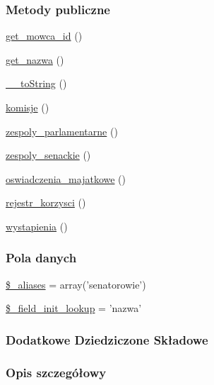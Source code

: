 \subsubsection*{Metody publiczne}
\begin{DoxyCompactItemize}
\item 
\hyperlink{classep___senator_a2048656fee42acbb0bd6a87c65d1812c}{get\-\_\-mowca\-\_\-id} ()
\item 
\hyperlink{classep___senator_ac0818f0049d7b84f08f77128f54cee36}{get\-\_\-nazwa} ()
\item 
\hyperlink{classep___senator_a7516ca30af0db3cdbf9a7739b48ce91d}{\-\_\-\-\_\-to\-String} ()
\item 
\hyperlink{classep___senator_a66895e14014726b555618e5b409771bd}{komisje} ()
\item 
\hyperlink{classep___senator_acf90e2692da0f334ab0dfce03e3a9e7a}{zespoly\-\_\-parlamentarne} ()
\item 
\hyperlink{classep___senator_ae0fd986698b921926b3d3f6f3c6fd674}{zespoly\-\_\-senackie} ()
\item 
\hyperlink{classep___senator_ab7a97df64d38268bc2d006b6666d0275}{oswiadczenia\-\_\-majatkowe} ()
\item 
\hyperlink{classep___senator_a6c022f0121768edc931338ecb59e0dca}{rejestr\-\_\-korzysci} ()
\item 
\hyperlink{classep___senator_a18b1bf1c04262c23e5edc5c81a4f897c}{wystapienia} ()
\end{DoxyCompactItemize}
\subsubsection*{Pola danych}
\begin{DoxyCompactItemize}
\item 
\hyperlink{classep___senator_ab4e31d75f0bc5d512456911e5d01366b}{\$\-\_\-aliases} = array('senatorowie')
\item 
\hyperlink{classep___senator_a4a4d54ae35428077a7c61ec8a5139af3}{\$\-\_\-field\-\_\-init\-\_\-lookup} = 'nazwa'
\end{DoxyCompactItemize}
\subsubsection*{Dodatkowe Dziedziczone Składowe}


\subsubsection{Opis szczegółowy}


